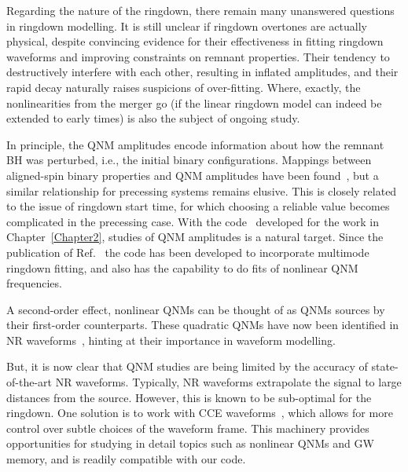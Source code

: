 \documentclass[
12pt, %
english, %
doublespacing, %
headsepline, %
]{MastersDoctoralThesis} %
\begin{document}
Regarding the nature of the ringdown, there remain many unanswered questions in ringdown modelling. 
It is still unclear if ringdown overtones are actually physical, despite convincing evidence for their effectiveness in fitting ringdown waveforms and improving constraints on remnant properties.
Their tendency to destructively interfere with each other, resulting in inflated amplitudes, and their rapid decay naturally raises suspicions of over-fitting.
Where, exactly, the nonlinearities from the merger go (if the linear ringdown model can indeed be extended to early times) is also the subject of ongoing study.

In principle, the QNM amplitudes encode information about how the remnant BH was perturbed, i.e., the initial binary configurations.
Mappings between aligned-spin binary properties and QNM amplitudes have been found~\cite{London:2014cma}, but a similar relationship for precessing systems remains elusive.
This is closely related to the issue of ringdown start time, for which choosing a reliable value becomes complicated in the precessing case.
With the code~\cite{qnmfits} developed for the work in Chapter~\ref{Chapter2}, studies of QNM amplitudes is a natural target.
Since the publication of Ref.~\cite{Finch:2021iip} the code has been developed to incorporate multimode ringdown fitting, and also has the capability to do fits of nonlinear QNM frequencies.

A second-order effect, nonlinear QNMs can be thought of as QNMs sources by their first-order counterparts.
These quadratic QNMs have now been identified in NR waveforms~\cite{Cheung:2022rbm, Mitman:2022qdl}, hinting at their importance in waveform modelling.

But, it is now clear that QNM studies are being limited by the accuracy of state-of-the-art NR waveforms. 
Typically, NR waveforms extrapolate the signal to large distances from the source.
However, this is known to be sub-optimal for the ringdown.
One solution is to work with CCE waveforms~\cite{MaganaZertuche:2021syq}, which allows for more control over subtle choices of the waveform frame.
This machinery provides opportunities for studying in detail topics such as nonlinear QNMs and GW memory, and is readily compatible with our code.
\end{document}
